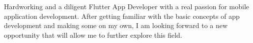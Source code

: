 

\begin{cvparagraph}


Hardworking and a diligent Flutter App Developer with a real passion for mobile application development. After getting familiar with the basic concepts of app development and making some on my own, I am looking forward to a new opportunity that will allow me to further explore this field.

\end{cvparagraph}
